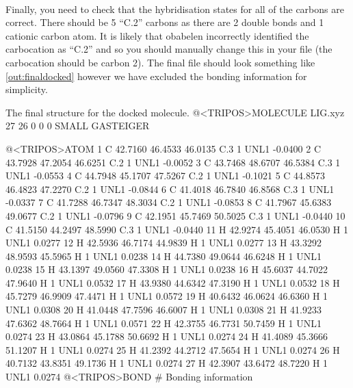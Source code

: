     \paragraph{}
        Finally, you need to check that the hybridisation states for all of the carbons are correct. There should be 5 \enquote{C.2} carbons as there are 2 double bonds and 1 cationic carbon atom. It is likely that obabelen incorrectly identified the carbocation as \enquote{C.2} and so you should manually change this in your file (the carbocation should be carbon 2). The final file should look something like \cref{out:finaldocked} however we have excluded the bonding information for simplicity.

    \begin{bashoutput}[label=out:finaldocked]{The final structure for the docked molecule.}
@<TRIPOS>MOLECULE
LIG.xyz
 27 26 0 0 0
SMALL
GASTEIGER

@<TRIPOS>ATOM
    1 C  42.7160   46.4533   46.0135 C.3    1  UNL1    -0.0400
    2 C  43.7928   47.2054   46.6251 C.2    1  UNL1    -0.0052
    3 C  43.7468   48.6707   46.5384 C.3    1  UNL1    -0.0553
    4 C  44.7948   45.1707   47.5267 C.2    1  UNL1    -0.1021
    5 C  44.8573   46.4823   47.2270 C.2    1  UNL1    -0.0844
    6 C  41.4018   46.7840   46.8568 C.3    1  UNL1    -0.0337
    7 C  41.7288   46.7347   48.3034 C.2    1  UNL1    -0.0853
    8 C  41.7967   45.6383   49.0677 C.2    1  UNL1    -0.0796
    9 C  42.1951   45.7469   50.5025 C.3    1  UNL1    -0.0440
   10 C  41.5150   44.2497   48.5990 C.3    1  UNL1    -0.0440
   11 H  42.9274   45.4051   46.0530 H      1  UNL1     0.0277
   12 H  42.5936   46.7174   44.9839 H      1  UNL1     0.0277
   13 H  43.3292   48.9593   45.5965 H      1  UNL1     0.0238
   14 H  44.7380   49.0644   46.6248 H      1  UNL1     0.0238
   15 H  43.1397   49.0560   47.3308 H      1  UNL1     0.0238
   16 H  45.6037   44.7022   47.9640 H      1  UNL1     0.0532
   17 H  43.9380   44.6342   47.3190 H      1  UNL1     0.0532
   18 H  45.7279   46.9909   47.4471 H      1  UNL1     0.0572
   19 H  40.6432   46.0624   46.6360 H      1  UNL1     0.0308
   20 H  41.0448   47.7596   46.6007 H      1  UNL1     0.0308
   21 H  41.9233   47.6362   48.7664 H      1  UNL1     0.0571
   22 H  42.3755   46.7731   50.7459 H      1  UNL1     0.0274
   23 H  43.0864   45.1788   50.6692 H      1  UNL1     0.0274
   24 H  41.4089   45.3666   51.1207 H      1  UNL1     0.0274
   25 H  41.2392   44.2712   47.5654 H      1  UNL1     0.0274
   26 H  40.7132   43.8351   49.1736 H      1  UNL1     0.0274
   27 H  42.3907   43.6472   48.7220 H      1  UNL1     0.0274
@<TRIPOS>BOND
 # Bonding information
    \end{bashoutput}